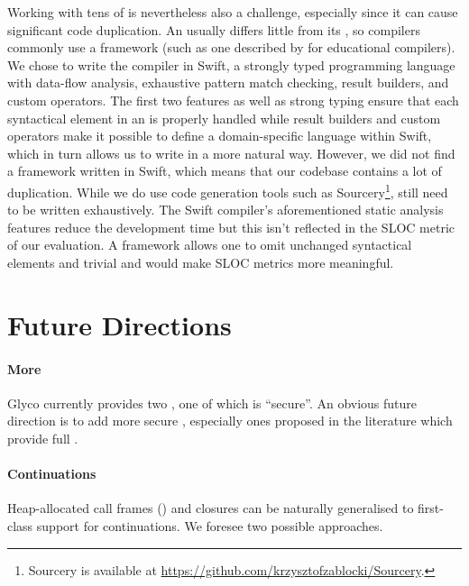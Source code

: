 \documentclass[main.tex]{subfiles}
\begin{document}
Working with tens of  is nevertheless also a challenge, especially since it can cause significant code duplication. An  usually differs little from its , so  compilers commonly use a framework (such as one described by \citet{educomp} for educational compilers). We chose to write the compiler in Swift, a strongly typed programming language with data-flow analysis, exhaustive pattern match checking, result builders, and custom operators. The first two features as well as strong typing ensure that each syntactical element in an  is properly handled while result builders and custom operators make it possible to define a domain-specific language within Swift, which in turn allows us to write  in a more natural way. However, we did not find a  framework written in Swift, which means that our codebase contains a lot of duplication. While we do use code generation tools such as Sourcery\footnote{Sourcery is available at \url{https://github.com/krzysztofzablocki/Sourcery}.},  still need to be written exhaustively. The Swift compiler's aforementioned static analysis features reduce the development time but this isn't reflected in the SLOC metric of our evaluation. A  framework allows one to omit unchanged syntactical elements and trivial  and would make SLOC metrics more meaningful.


\section{Future Directions}
\paragraph{More } Glyco currently provides two , one of which is \enquote{secure}. An obvious future direction is to add more secure , especially ones proposed in the literature which provide full .

\paragraph{Continuations} Heap-allocated call frames () and closures can be naturally generalised to first-class support for continuations. We foresee two possible approaches.
\end{document}
